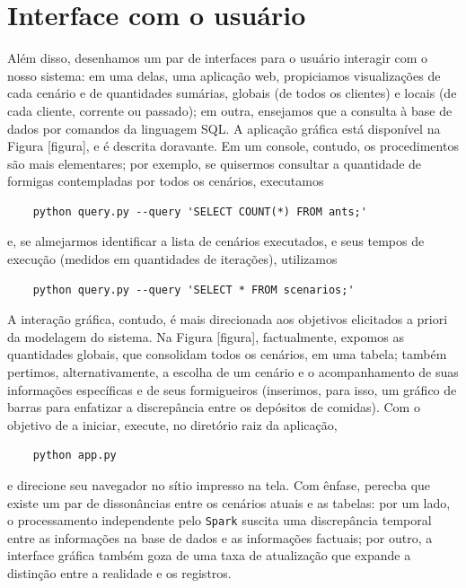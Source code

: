 \documentclass[12pt,oneside,a4paper]{article}
\begin{document}
\section{Interface com o usuário} \label{sec:user} 

Além disso, desenhamos um par de interfaces para o usuário interagir com o nosso sistema: em uma delas, uma aplicação web, propiciamos visualizações de cada cenário e de quantidades sumárias, globais (de todos os clientes) e locais (de cada cliente, corrente ou passado); em outra, ensejamos que a consulta à base de dados por comandos da linguagem SQL. A aplicação gráfica está disponível na Figura [figura], e é descrita doravante. Em um console, contudo, os procedimentos são mais elementares; por exemplo, se quisermos consultar a quantidade de formigas contempladas por todos os cenários, executamos

\begin{lstlisting} 
	python query.py --query 'SELECT COUNT(*) FROM ants;'
\end{lstlisting} 

\noindent e, se almejarmos identificar a lista de cenários executados, e seus tempos de execução (medidos em quantidades de iterações), utilizamos 

\begin{lstlisting} 
	python query.py --query 'SELECT * FROM scenarios;'    
\end{lstlisting} 

A interação gráfica, contudo, é mais direcionada aos objetivos elicitados a priori da modelagem do sistema. Na Figura [figura], factualmente, expomos as quantidades globais, que consolidam todos os cenários, em uma tabela; também pertimos, alternativamente, a escolha de um cenário e o acompanhamento de suas informações específicas e de seus formigueiros (inserimos, para isso, um gráfico de barras para enfatizar a discrepância entre os depósitos de comidas). Com o objetivo de a iniciar, execute, no diretório raiz da aplicação, 

\begin{lstlisting} 
	python app.py    
\end{lstlisting} 

\noindent e direcione seu navegador no sítio impresso na tela. Com ênfase, perecba que existe um par de dissonâncias entre os cenários atuais e as tabelas: por um lado, o processamento independente pelo \texttt{Spark} suscita uma discrepância temporal entre as informações na base de dados e as informações factuais; por outro, a interface gráfica também goza de uma taxa de atualização que expande a distinção entre a realidade e os registros.  
\end{document}
